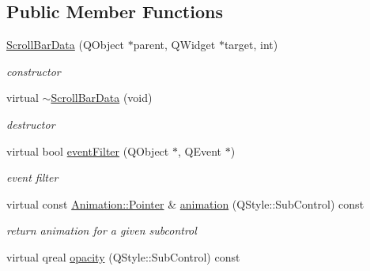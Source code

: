 \subsection*{Public Member Functions}
\begin{DoxyCompactItemize}
\item 
\mbox{\label{class_scroll_bar_data_a099150e5d2faf05f1de930fbdef194fa}} 
\hyperlink{class_scroll_bar_data_a099150e5d2faf05f1de930fbdef194fa}{Scroll\+Bar\+Data} (Q\+Object $\ast$parent, Q\+Widget $\ast$target, int)
\begin{DoxyCompactList}\small\item\em constructor \end{DoxyCompactList}\item 
\mbox{\label{class_scroll_bar_data_a2cdfda64fe95dfe6287580227e5b87ba}} 
virtual \hyperlink{class_scroll_bar_data_a2cdfda64fe95dfe6287580227e5b87ba}{$\sim$\+Scroll\+Bar\+Data} (void)
\begin{DoxyCompactList}\small\item\em destructor \end{DoxyCompactList}\item 
\mbox{\label{class_scroll_bar_data_aebce11850eff69c26a3ad3e3f6f77502}} 
virtual bool \hyperlink{class_scroll_bar_data_aebce11850eff69c26a3ad3e3f6f77502}{event\+Filter} (Q\+Object $\ast$, Q\+Event $\ast$)
\begin{DoxyCompactList}\small\item\em event filter \end{DoxyCompactList}\item 
\mbox{\label{class_scroll_bar_data_a84ccbbb275e5e14f70e5f6d47c9b61c4}} 
virtual const \hyperlink{class_animation_ac48a8d074abd43dc3f6485353ba24e30}{Animation\+::\+Pointer} \& \hyperlink{class_scroll_bar_data_a84ccbbb275e5e14f70e5f6d47c9b61c4}{animation} (Q\+Style\+::\+Sub\+Control) const
\begin{DoxyCompactList}\small\item\em return animation for a given subcontrol \end{DoxyCompactList}\item 
\mbox{\label{class_scroll_bar_data_a3fa44e9359fe90003723fe0b7e4ae846}} 
virtual qreal \hyperlink{class_scroll_bar_data_a3fa44e9359fe90003723fe0b7e4ae846}{opacity} (Q\+Style\+::\+Sub\+Control) const

\end{DoxyCompactItemize}
